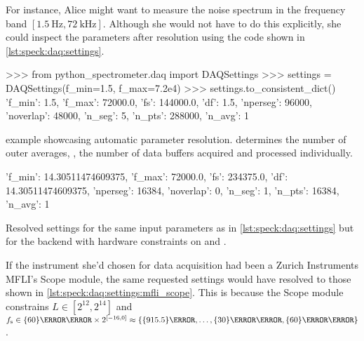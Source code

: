 For instance, Alice might want to measure the noise spectrum in the frequency band $[\qty{1.5}{\hertz}, \qty{72}{\kilo\hertz}]$.
Although she would not have to do this explicitly,
she could inspect the parameters after resolution using the code shown in \cref{lst:speck:daq:settings}.

\begin{listing}[htpb]
    \begin{py}
        >>> from python_spectrometer.daq import DAQSettings
        >>> settings = DAQSettings(f_min=1.5, f_max=7.2e4)
        >>> settings.to_consistent_dict()
        {'f_min': 1.5,
         'f_max': 72000.0,
         'fs': 144000.0,
         'df': 1.5,
         'nperseg': 96000,
         'noverlap': 48000,
         'n_seg': 5,
         'n_pts': 288000,
         'n_avg': 1}
    \end{py}
    \caption{
         example showcasing automatic parameter resolution.
         determines the number of outer averages, \ie, the number of data buffers acquired and processed individually.
    }
    \label{lst:speck:daq:settings}
\end{listing}

\begin{marginlisting}[-2.5cm]
    \begin{py}[fontsize=\footnotesize]
    {'f_min': 14.30511474609375,
     'f_max': 72000.0,
     'fs': 234375.0,
     'df': 14.30511474609375,
     'nperseg': 16384,
     'noverlap': 0,
     'n_seg': 1,
     'n_pts': 16384,
     'n_avg': 1}
    \end{py}
    \caption[Resolved  for MFLI Scope]{
        Resolved settings for the same input parameters as in \cref{lst:speck:daq:settings} but for the  backend with hardware constraints on  and .
    }
    \label{lst:speck:daq:settings:mfli_scope}
\end{marginlisting}

If the instrument she'd chosen for data acquisition had been a Zurich Instruments MFLI's Scope module,
the same requested settings would have resolved to those shown in \cref{lst:speck:daq:settings:mfli_scope}.
This is because the Scope module constrains $L\in[2^{12},2^{14}]$ and $\fs\in\qty{60}{\mega\hertz}\times 2^{[-16, 0]} \approx \allowbreak \lbrace \qty{915.5}{\hertz}, \allowbreak \dotsc, \allowbreak \qty{30}{\mega\hertz}, \qty{60}{\mega\hertz}\rbrace$.

